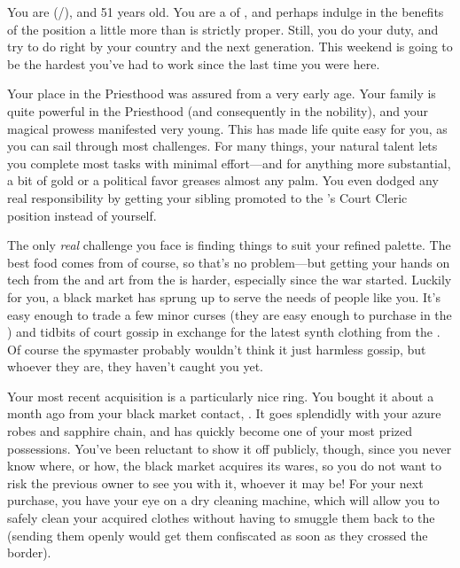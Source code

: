 \documentclass[char]{GL2020}
\begin{document}
\name{\cHedonist{}}

You are \cHedonist{\full} (\cHedonist{\they}/\cHedonist{\them}), and 51 years old. You are a \cHedonist{\cleric} of \cFarmGod{}, and perhaps indulge in the benefits of the position a little more than is strictly proper. Still, you do your duty, and try to do right by your country and the next generation. This weekend is going to be the hardest you've had to work since the last time you were here.

Your place in the Priesthood was assured from a very early age. Your family is quite powerful in the Priesthood (and consequently in the nobility), and your magical prowess manifested very young. This has made life quite easy for you, as you can sail through most challenges. For many things, your natural talent lets you complete most tasks with minimal effort---and for anything more substantial, a bit of gold or a political favor greases almost any palm. You even dodged any real responsibility by getting your sibling promoted to the \cQueen{\Majesty}'s Court Cleric position instead of yourself.

The only \emph{real} challenge you face is finding things to suit your refined palette. The best food comes from \pFarm{} of course, so that's no problem---but getting your hands on tech from the \pTech{} and art from the \pShip{} is harder, especially since the war started. Luckily for you, a black market has sprung up to serve the needs of people like you. It's easy enough to trade a few minor curses (they are easy enough to purchase in the \pFarm{}) and tidbits of court gossip in exchange for the latest synth clothing from the \pTech{}. Of course the \pFarm{} spymaster probably wouldn't think it just harmless gossip, but whoever they are, they haven't caught you yet. 

Your most recent acquisition is a particularly nice ring. You bought it about a month ago from your black market contact, \cChupSecond{\full}. It goes splendidly with your azure robes and sapphire chain, and has quickly become one of your most prized possessions. You've been reluctant to show it off publicly, though, since you never know where, or how, the black market acquires its wares, so you do not want to risk the previous owner to see you with it, whoever it may be! For your next purchase, you have your eye on a dry cleaning machine, which will allow you to safely clean your acquired clothes without having to smuggle them back to the \pTech{} (sending them openly would get them confiscated as soon as they crossed the border).
\end{document}
